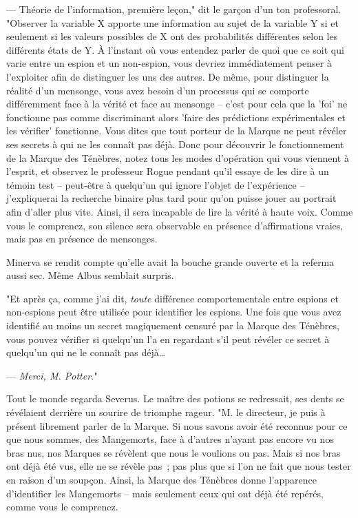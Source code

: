 --- Théorie de l'information, première leçon," dit le garçon d'un ton professoral. "Observer la variable X apporte une information au sujet de la variable Y si et seulement si les valeurs possibles de X ont des probabilités différentes selon les différents états de Y. À l'instant où vous entendez parler de quoi que ce soit qui varie entre un espion et un non-espion, vous devriez immédiatement penser à l'exploiter afin de distinguer les uns des autres. De même, pour distinguer la réalité d'un mensonge, vous avez besoin d'un processus qui se comporte différemment face à la vérité et face au mensonge -- c'est pour cela que la 'foi' ne fonctionne pas comme discriminant alors 'faire des prédictions expérimentales et les vérifier' fonctionne. Vous dites que tout porteur de la Marque ne peut révéler ses secrets à qui ne les connaît pas déjà. Donc pour découvrir le fonctionnement de la Marque des Ténèbres, notez tous les modes d'opération qui vous viennent à l'esprit, et observez le professeur Rogue pendant qu'il essaye de les dire à un témoin test -- peut-être à quelqu'un qui ignore l'objet de l'expérience -- j'expliquerai la recherche binaire plus tard pour qu'on puisse jouer au portrait afin d'aller plus vite. Ainsi, il sera incapable de lire la vérité à haute voix. Comme vous le comprenez, son silence sera observable en présence d'affirmations vraies, mais pas en présence de mensonges.

Minerva se rendit compte qu'elle avait la bouche grande ouverte et la referma aussi sec. Même Albus semblait surpris.

"Et après ça, comme j'ai dit, \emph{toute} différence comportementale entre espions et non-espions peut être utilisée pour identifier les espions. Une fois que vous avez identifié au moins un secret magiquement censuré par la Marque des Ténèbres, vous pouvez vérifier si quelqu'un l'a en regardant s'il peut révéler ce secret à quelqu'un qui ne le connaît pas déjà…

--- \emph{Merci, M. Potter.}"

Tout le monde regarda Severus. Le maître des potions se redressait, ses dents se révélaient derrière un sourire de triomphe rageur. "M. le directeur, je puis à présent librement parler de la Marque. Si nous savons avoir été reconnus pour ce que nous sommes, des Mangemorts, face à d'autres n'ayant pas encore vu nos bras nus, nos Marques se révèlent que nous le voulions ou pas. Mais si nos bras ont déjà été vus, elle ne se révèle pas~; pas plus que si l'on ne fait que nous tester en raison d'un soupçon. Ainsi, la Marque des Ténèbres donne l'apparence d'identifier les Mangemorts -- mais seulement ceux qui ont déjà été repérés, comme vous le comprenez.


